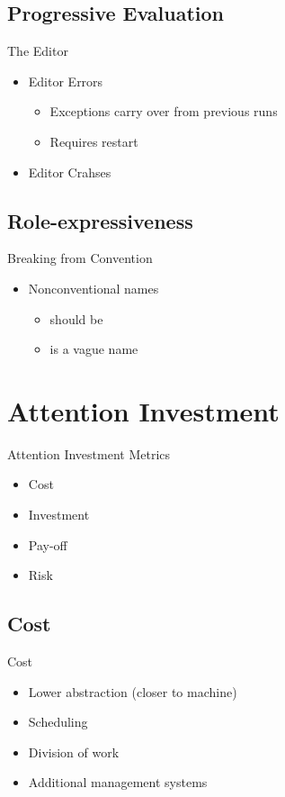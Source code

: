 \subsection{Progressive Evaluation}
\begin{frame}{\secname}{\subsecname}
	The Editor
	\begin{itemize}
		\item Editor Errors
		\begin{itemize}
			\item Exceptions carry over from previous runs
			\item Requires restart
		\end{itemize}
		\item Editor Crahses
	\end{itemize}
\end{frame}

\subsection{Role-expressiveness}
\begin{frame}{\secname}{\subsecname}
	Breaking from Convention
	\begin{itemize}
		\item Nonconventional names
		\begin{itemize}
			\item {} should be 
			\item {} is a vague name
		\end{itemize}
	\end{itemize}
\end{frame}

\section{Attention Investment}
\begin{frame}{\secname}{\subsecname}
	Attention Investment Metrics
	\begin{itemize}
		\item Cost
		\item Investment
		\item Pay-off
		\item Risk
	\end{itemize}
\end{frame}

\subsection{Cost}
\begin{frame}{\secname}{\subsecname}
	Cost
	\begin{itemize}
		\item Lower abstraction (closer to machine)
		\item Scheduling
		\item Division of work
		\item Additional management systems
	\end{itemize}
\end{frame}

